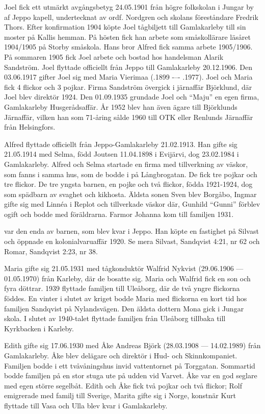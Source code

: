 Joel fick ett utmärkt avgångsbetyg 24.05.1901 från högre folkskolan i Jungar by af Jeppo kapell, undertecknat av ordf. Nordgren och skolans	föreståndare Fredrik Thors. Efter konfirmation 1904 köpte Joel tågbiljett	till Gamlakarleby till sin moster på Kallis hemman. På hösten fick han arbete som småskollärare läsåret 1904/1905 på Storby småskola. Hans	bror Alfred fick samma arbete 1905/1906. På sommaren 1905 fick Joel arbete och bostad hos handelsman Alarik Sandström. Joel flyttade 	officiellt från Jeppo till Gamlakarleby 20.12.1906. Den 03.06.1917 gifter Joel sig med Maria Vierimaa (.1899  -–-  .1977). Joel och Maria 	fick 4 flickor och 3 pojkar. Firma Sandström övergick i järnaffär Björklund, där Joel blev direktör 1924. Den 01.09.1935 grundade Joel och ``Maju'' en egen firma, Gamlakarleby Husgerådsaffär. År 1952 blev	han även ägare till Björklunds Järnaffär, vilken han som 71-åring sålde 1960 till OTK eller Renlunds Järnaffär från Helsingfors.

Alfred flyttade officiellt från Jeppo-Gamlakarleby 21.02.1913. Han gifte sig 21.05.1914 med Selma, född Joutsen 11.04.1898 i Evijärvi, dog 23.02.1984 i Gamlakarleby. Alfred och Selma startade en firma med tillverkning av väskor, som fanns i samma hus, som de bodde i på Långbrogatan. De fick tre pojkar och tre flickor. De tre yngsta barnen, en pojke och två flickor, födda 1921-1924, dog som spädbarn av svaghet och kikhosta. Äldsta sonen Sven blev Borgåbo, Ingmar gifte sig med Linnéa i Replot och tillverkade väskor där, Gunhild ``Gunni'' förblev ogift och bodde med föräldrarna. Farmor Johanna kom till familjen 1931.

 var den enda av barnen, som blev kvar i Jeppo. Han köpte en fastighet på Silvast och öppnade en kolonialvaruaffär 1920. Se mera 	Silvast, Sandqvist 4:21, nr 62 och Romar, Sandqvist 2:23, nr 38.

Maria gifte sig 21.05.1931 med tågkonduktör Walfrid Nykvist (29.06.1906 --- 01.05.1970) från Karleby, där de bosatte sig. Maria och Walfrid fick en son och fyra döttrar. 1939 flyttade familjen till Uleåborg, där de två yngre flickorna föddes. En vinter i slutet av kriget bodde Maria med flickorna en kort tid hos familjen Sandqvist på Nylandsvägen. Den äldsta dottern Mona gick i Jungar skola. I slutet av 1940-talet flyttade 	familjen från Uleåborg tillbaka till Kyrkbacken i Karleby.

Edith gifte sig 17.06.1930 med Åke Andreas Björk (28.03.1908 --- 14.02.1989) från Gamlakarleby. Åke blev delägare och direktör i Hud- 	och Skinnkompaniet. Familjen bodde i ett tvåvåningshus invid 	vattentornet på Torggatan. Sommartid bodde familjen på en stor stuga ute på udden vid Varvet. Åke var en god seglare med egen större segelbåt. Edith och Åke fick två pojkar och två flickor; Rolf emigrerade med familj till Sverige, Marita gifte sig i Norge, konstnär Kurt flyttade till Vasa och Ulla blev kvar i Gamlakarleby.



